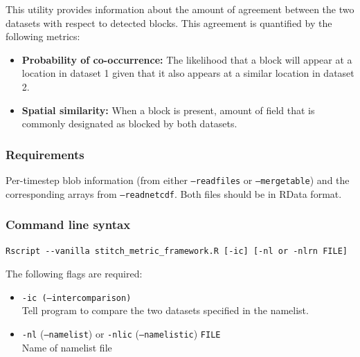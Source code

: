 \documentclass{article}
\begin{document}
This utility  provides information about the amount of agreement between the two datasets with respect to detected blocks. This agreement is quantified by the following metrics:
\begin{itemize}
\item \textbf{Probability of co-occurrence:} The likelihood that a block will appear at a location in dataset 1  given that it also appears at a similar location in dataset 2.
\item \textbf{Spatial similarity:} When a block is present, amount of field that is commonly designated as blocked by both datasets. 
\end{itemize}

\subsubsection{Requirements}

Per-timestep blob information (from either \texttt{--readfiles} or \texttt{--mergetable}) and the corresponding arrays from \texttt{--readnetcdf}. Both files should be in RData format.

\subsubsection{Command line syntax}
\begin{verbatim}
Rscript --vanilla stitch_metric_framework.R [-ic] [-nl or -nlrn FILE]
\end{verbatim}


The following flags are required:

\begin{itemize}
\item[] \texttt{-ic (--intercomparison)}\\Tell program to compare the two datasets specified in the namelist.
\item[]\texttt{-nl} (\texttt{--namelist}) or \texttt{-nlic} (\texttt{--namelistic}) \texttt{FILE}\\ Name of namelist file
\end{itemize}
\end{document}
